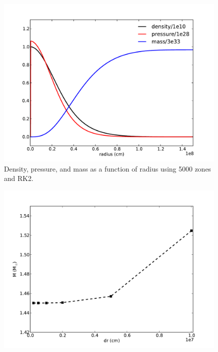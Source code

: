 \documentclass[12pt,preprint]{aastex}
\begin{document}
\begin{figure}[!ht]
\begin{center}
\includegraphics[width=5in]{profiles.pdf}
\end{center}
\caption{Density, pressure, and mass as a function of radius using 5000 zones and RK2. \label{f:profiles}}
\end{figure}

\begin{figure}[!ht]
\begin{center}
\includegraphics[width=5in]{RK3_mass.pdf}
\end{center}
\caption{ \label{f:RK3_mass}}
\end{figure}
\end{document}
